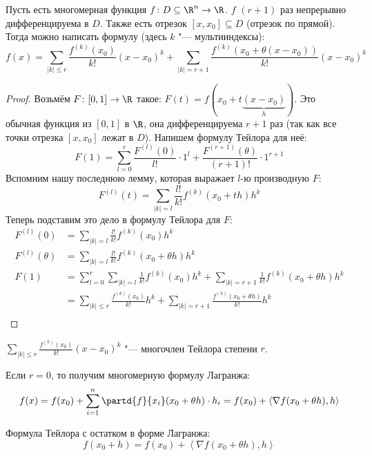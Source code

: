 
\begin{theorem}
	Пусть есть многомерная функция $f \colon D \subseteq \R^n \to \R$.
	$f$ $(r+1)$ раз непрерывно дифференцируема в $D$.
	Также есть отрезок $[x, x_0] \subseteq D$ (отрезок по прямой).
	Тогда можно написать формулу (здесь $k$ "--- мультииндексы):
	\[ f(x) = \sum_{|k| \le r} \frac{f^{(k)}(x_0)}{k!} (x - x_0)^k + \sum_{|k| = r + 1} \frac{f^{(k)}(x_0+\theta(x-x_0))}{k!} (x-x_0)^k\]
\end{theorem}
\begin{proof}
	Возьмём $F \colon [0, 1] \to \R$ такое: $F(t)=f(x_0+t\underbrace{(x-x_0)}_{h})$.
	Это обычная функция из $[0, 1]$ в $\R$, она дифференцируема $r+1$ раз (так как все точки отрезка $[x, x_0]$ лежат в $D$).
	Напишем формулу Тейлора для неё:
	\[ F(1) = \sum_{l=0}^r \frac{F^{(l)}(0)}{l!} \cdot 1^l + \frac{F^{(r+1)}(\theta)}{(r+1)!} \cdot 1 ^ {r+1}\]
	Вспомним нашу последнюю лемму, которая выражает $l$-ю производную $F$:
	\[ F^{(l)}(t) = \sum_{|k| = l} \frac{l!}{k!} f^{(k)}(x_0+th) h^k\]
	Теперь подставим это дело в формулу Тейлора для $F$:
	\begin{align*}
		F^{(l)}(0) &= \sum_{|k| = l} \frac{l!}{k!} f^{(k)}(x_0) h^k \\
		F^{(l)}(\theta) &= \sum_{|k| = l} \frac{l!}{k!} f^{(k)}(x_0 + \theta h) h^k \\
		F(1) &= \sum_{l=0}^r \sum_{|k| = l} \frac{1}{k!} f^{(k)}(x_0) h^k + \sum_{|k| = r + 1} \frac{1}{k!} f^{(k)}(x_0 + \theta h) h^k \\
		     &= \sum_{|k| \le r} \frac{f^{(k)}(x_0)}{k!} h^k + \sum_{|k| = r + 1} \frac{f^{(k)}(x_0 + \theta h)}{k!} h^k \\
	\end{align*}
\end{proof}
\begin{Rem}
	$\sum_{|k|\le r} \frac{f^{(k)} (x_0)}{k!} (x - x_0) ^ k$ "--- многочлен Тейлора степени $r$.
\end{Rem}
\begin{Rem}
	Если $r=0$, то получим многомерную формулу Лагранжа:
	\[f(x) = f(x_0) + \sum_{i=1}^n \partd{f}{x_i} (x_0+\theta h) \cdot h_i = f(x_0) + \left< \nabla f(x_0+\theta h), h \right>\]
\end{Rem}
\begin{conseq}
	Формула Тейлора с остатком в форме Лагранжа:
	\[ f(x_0 + h) = f(x_0) + \left< \nabla f (x_0+\theta h), h \right> \]
\end{conseq}
